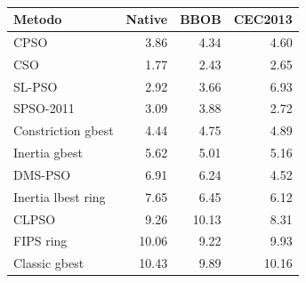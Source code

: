 \begin{table}[!htbp]
\color{RevisionBlue}
\centering\small
\caption{}
\label{tab:study3-ranks}
\begin{tabular}{@{}lrrr@{}}
\toprule
Metodo & Native & BBOB & CEC2013 \\
\midrule
CPSO & 3.86 & 4.34 & 4.60 \\
CSO & 1.77 & 2.43 & 2.65 \\
SL-PSO & 2.92 & 3.66 & 6.93 \\
SPSO-2011 & 3.09 & 3.88 & 2.72 \\
Constriction gbest & 4.44 & 4.75 & 4.89 \\
Inertia gbest & 5.62 & 5.01 & 5.16 \\
DMS-PSO & 6.91 & 6.24 & 4.52 \\
Inertia lbest ring & 7.65 & 6.45 & 6.12 \\
CLPSO & 9.26 & 10.13 & 8.31 \\
FIPS ring & 10.06 & 9.22 & 9.93 \\
Classic gbest & 10.43 & 9.89 & 10.16 \\
\bottomrule
\end{tabular}
\end{table}
